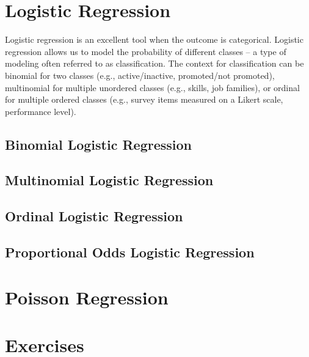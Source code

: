 \documentclass[]{book}
\begin{document}
\hypertarget{logistic-regression}{%
\section{Logistic Regression}\label{logistic-regression}}

Logistic regression is an excellent tool when the outcome is categorical. Logistic regression allows us to model the probability of different classes -- a type of modeling often referred to as classification. The context for classification can be binomial for two classes (e.g., active/inactive, promoted/not promoted), multinomial for multiple unordered classes (e.g., skills, job families), or ordinal for multiple ordered classes (e.g., survey items measured on a Likert scale, performance level).

\hypertarget{binomial-logistic-regression}{%
\subsection{Binomial Logistic Regression}\label{binomial-logistic-regression}}

\hypertarget{multinomial-logistic-regression}{%
\subsection{Multinomial Logistic Regression}\label{multinomial-logistic-regression}}

\hypertarget{ordinal-logistic-regression}{%
\subsection{Ordinal Logistic Regression}\label{ordinal-logistic-regression}}

\hypertarget{proportional-odds-logistic-regression}{%
\subsection{Proportional Odds Logistic Regression}\label{proportional-odds-logistic-regression}}

\hypertarget{poisson-regression}{%
\section{Poisson Regression}\label{poisson-regression}}

\hypertarget{exercises-8}{%
\section{Exercises}\label{exercises-8}}
\end{document}
